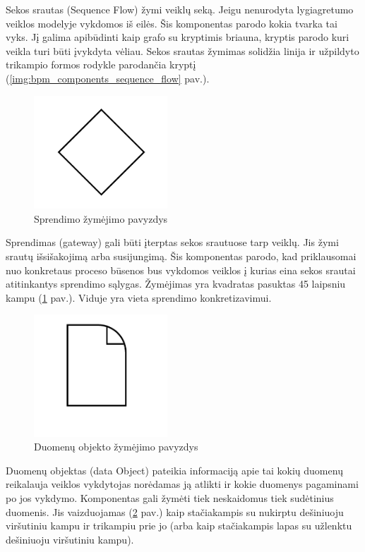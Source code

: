 Sekos srautas (Sequence Flow) žymi veiklų seką. Jeigu nenurodyta lygiagretumo veiklos modelyje vykdomos iš eilės. Šis komponentas parodo kokia tvarka tai vyks. Jį galima apibūdinti kaip grafo su kryptimis briauna, kryptis parodo kuri veikla turi būti įvykdyta vėliau. Sekos srautas žymimas solidžia linija ir užpildyto trikampio formos rodykle parodančia kryptį (\ref{img:bpm_components_sequence_flow} pav.).

\begin{figure}[H]
	\centering
	\includegraphics[width=5cm]{img/bpm-components/gateway}
	\caption{Sprendimo žymėjimo pavyzdys}
	\label{img:bpm_components_gateway}
\end{figure}

Sprendimas (gateway) gali būti įterptas sekos srautuose tarp veiklų. Jis žymi srautų išsišakojimą arba susijungimą. Šis komponentas parodo, kad priklausomai nuo konkretaus proceso būsenos bus vykdomos veiklos į kurias eina sekos srautai atitinkantys sprendimo sąlygas. Žymėjimas yra kvadratas pasuktas 45 laipsniu kampu (\ref{img:bpm_components_gateway} pav.). Viduje yra vieta sprendimo konkretizavimui.

\begin{figure}[H]
	\centering
	\includegraphics[width=5cm]{img/bpm-components/data_object}
	\caption{Duomenų objekto žymėjimo pavyzdys}
	\label{img:bpm_components_data_object}
\end{figure}

Duomenų objektas (data Object) pateikia informaciją apie tai kokių duomenų reikalauja veiklos vykdytojas norėdamas ją atlikti ir kokie duomenys pagaminami po jos vykdymo. Komponentas gali žymėti tiek neskaidomus tiek sudėtinius duomenis. Jis vaizduojamas (\ref{img:bpm_components_data_object} pav.) kaip stačiakampis su nukirptu dešiniuoju viršutiniu kampu ir trikampiu prie jo (arba kaip stačiakampis lapas su užlenktu dešiniuoju viršutiniu kampu). 

